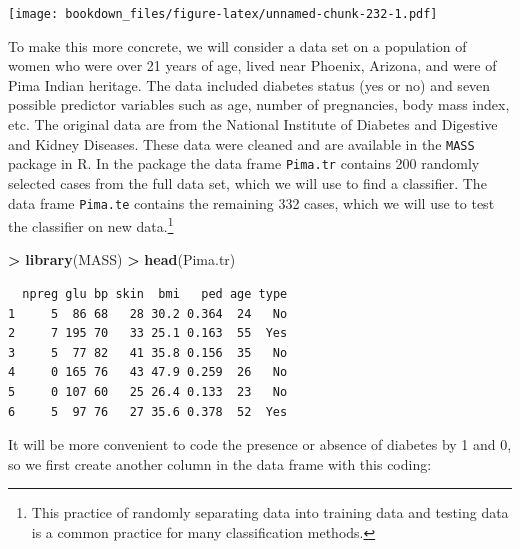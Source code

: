 \documentclass[]{krantz}
\makeatletter
\newenvironment{Shaded}{\begin{snugshade}}{\end{snugshade}}
\newcommand{\KeywordTok}[1]{\textcolor[rgb]{0.27,0.27,0.27}{\textbf{#1}}}
\newcommand{\DecValTok}[1]{\textcolor[rgb]{0.06,0.06,0.06}{#1}}
\newcommand{\StringTok}[1]{\textcolor[rgb]{0.5,0.5,0.5}{#1}}
\newcommand{\OperatorTok}[1]{\textcolor[rgb]{0.43,0.43,0.43}{\textbf{#1}}}
\newcommand{\NormalTok}[1]{#1}
\newenvironment{kframe}{%
\medskip{}
\setlength{\fboxsep}{.8em}
 \def\at@end@of@kframe{}%
 \ifinner\ifhmode%
  \def\at@end@of@kframe{\end{minipage}}%
  \begin{minipage}{\columnwidth}%
 \fi\fi%
 \def\FrameCommand##1{\hskip\@totalleftmargin \hskip-\fboxsep
 \colorbox{shadecolor}{##1}\hskip-\fboxsep
     \hskip-\linewidth \hskip-\@totalleftmargin \hskip\columnwidth}%
 \MakeFramed {\advance\hsize-\width
   \@totalleftmargin\z@ \linewidth\hsize
   \@setminipage}}%
 {\par\unskip\endMakeFramed%
 \at@end@of@kframe}
\renewenvironment{Shaded}{\begin{kframe}}{\end{kframe}}
\makeatother
\begin{document}
\texttt{[image: bookdown\_files/figure-latex/unnamed-chunk-232-1.pdf]}

To make this more concrete, we will consider a data set on a population
of women who were over 21 years of age, lived near Phoenix, Arizona, and
were of Pima Indian heritage. The data included diabetes status (yes or
no) and seven possible predictor variables such as age, number of
pregnancies, body mass index, etc. The original data are from the
National Institute of Diabetes and Digestive and Kidney Diseases. These
data were cleaned and are available in the \texttt{MASS} package in R.
In the package the data frame \texttt{Pima.tr} contains 200 randomly
selected cases from the full data set, which we will use to find a
classifier. The data frame \texttt{Pima.te} contains the remaining 332
cases, which we will use to test the classifier on new data.\footnote{This
  practice of randomly separating data into training data and testing
  data is a common practice for many classification methods.}

\begin{Shaded}
\begin{Highlighting}[]
\OperatorTok{>}\StringTok{ }\KeywordTok{library}\NormalTok{(MASS)}
\OperatorTok{>}\StringTok{ }\KeywordTok{head}\NormalTok{(Pima.tr)}
\end{Highlighting}
\end{Shaded}

\begin{verbatim}
  npreg glu bp skin  bmi   ped age type
1     5  86 68   28 30.2 0.364  24   No
2     7 195 70   33 25.1 0.163  55  Yes
3     5  77 82   41 35.8 0.156  35   No
4     0 165 76   43 47.9 0.259  26   No
5     0 107 60   25 26.4 0.133  23   No
6     5  97 76   27 35.6 0.378  52  Yes
\end{verbatim}

It will be more convenient to code the presence or absence of diabetes
by 1 and 0, so we first create another column in the data frame with
this coding:

\begin{Shaded}
\end{Shaded}
\end{document}
